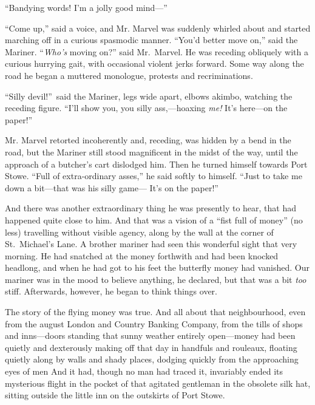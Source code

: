 “Bandying words! I’m a jolly good mind—”

“Come up,” said a voice, and Mr. Marvel was suddenly whirled about and started marching off in a curious spasmodic manner. “You’d better move on,” said the Mariner. “\emph{Who’s} moving on?” said Mr.\ Marvel. He was receding obliquely with a curious hurrying gait, with occasional violent jerks forward. Some way along the road he began a muttered monologue, protests and recriminations.

“Silly devil!”\ said the Mariner, legs wide apart, elbows akimbo, watching the receding figure. “I’ll show you, you silly ass,—hoaxing \emph{me!} It’s here—on the paper!”

Mr. Marvel retorted incoherently and, receding, was hidden by a bend in the road, but the Mariner still stood magnificent in the midst of the way, until the approach of a butcher’s cart dislodged him. Then he turned himself towards Port Stowe. “Full of extra-ordinary asses,” he said softly to himself. “Just to take me down a bit—that was his silly game— It’s on the paper!”

And there was another extraordinary thing he was presently to hear, that had happened quite close to him. And that was a vision of a “fist full of money” (no less) travelling without visible agency, along by the wall at the corner of St.\ Michael’s Lane. A brother mariner had seen this wonderful sight that very morning. He had snatched at the money forthwith and had been knocked headlong, and when he had got to his feet the butterfly money had vanished. Our mariner was in the mood to believe anything, he declared, but that was a bit \emph{too} stiff. Afterwards, however, he began to think things over.

The story of the flying money was true. And all about that neighbourhood, even from the august London and Country Banking Company, from the tills of shops and inns—doors standing that sunny weather entirely open—money had been quietly and dexterously making off that day in handfuls and rouleaux, floating quietly along by walls and shady places, dodging quickly from the approaching eyes of men And it had, though no man had traced it, invariably ended its mysterious flight in the pocket of that agitated gentleman in the obsolete silk hat, sitting outside the little inn on the outskirts of Port Stowe.